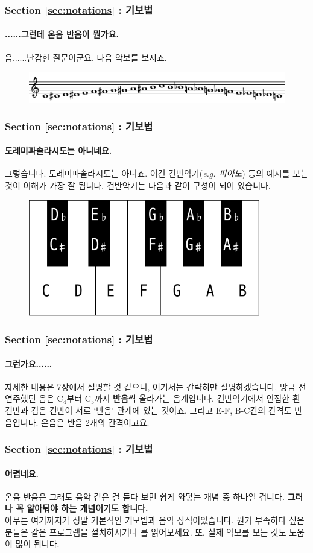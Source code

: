 \documentclass{beamer}
\begin{document}
	\begin{frame}
		\frametitle{Section \ref{sec:notations} : 기보법}
		\framesubtitle{......그런데 온음 반음이 뭔가요.}
		음......난감한 질문이군요. 다음 악보를 보시죠.
		\begin{figure}
			\centering
			\includegraphics[width=\textwidth]{res/pdf/4/scale/chromatic.pdf}
		\end{figure}
	\end{frame}
	
	\begin{frame}
		\frametitle{Section \ref{sec:notations} : 기보법}
		\framesubtitle{도레미파솔라시도는 아니네요.}
		그렇습니다. 도레미파솔라시도는 아니죠. 이건 건반악기({\it e.g. 피아노}) 등의 예시를 보는 것이 이해가 가장 잘 됩니다. 건반악기는 다음과 같이 구성이 되어 있습니다.
		\begin{figure}
			\centering
			\includegraphics[width=0.9\textwidth]{res/pdf/4/scale/keys.pdf}
		\end{figure}
	\end{frame}
	
	\begin{frame}
		\frametitle{Section \ref{sec:notations} : 기보법}
		\framesubtitle{그런가요......}
		자세한 내용은 7장에서 설명할 것 같으니, 여기서는 간략히만 설명하겠습니다. 방금 전 연주했던 음은 C$_4 $부터 C$_5 $까지 {\bf 반음}씩 올라가는 음계입니다. 건반악기에서 인접한 흰 건반과 검은 건반이 서로 `반음' 관계에 있는 것이죠. 그리고 E-F, B-C간의 간격도 반음입니다. 온음은 반음 2개의 간격이고요.
	\end{frame}
	
	\begin{frame}
		\frametitle{Section \ref{sec:notations} : 기보법}
		\framesubtitle{어렵네요.}
		온음 반음은 그래도 음악 같은 걸 듣다 보면 쉽게 와닿는 개념 중 하나일 겁니다. {\bf 그러나 꼭 알아둬야 하는 개념이기도 합니다.}\\
		아무튼 여기까지가 정말 기본적인 기보법과 음악 상식이었습니다. 뭔가 부족하다 싶은 분들은  
		{} 같은 프로그램을 설치하시거나 {}를 읽어보세요. 또, 실제 악보를 보는 것도 도움이 많이 됩니다.
	\end{frame}
	
\end{document}
